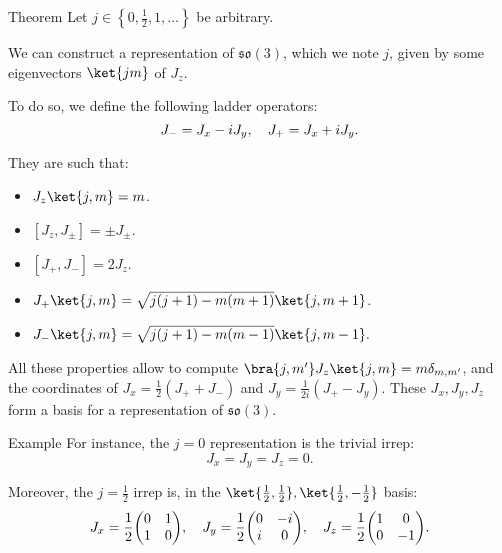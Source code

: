 \documentclass[a4paper]{article}
\begin{document}
\begin{parag}{Theorem}
    Let $j \in \left\{0, \frac{1}{2}, 1, \ldots\right\}$ be arbitrary.

    We can construct a representation of $\mathfrak{so}\left(3\right)$, which we note $j$, given by some eigenvectors $\ket{j m}$ of $J_z$. 

    To do so, we define the following ladder operators: 
    \[J_- = J_x - i J_y, \quad J_+ = J_x + i J_y.\]
    
    They are such that:
    \begin{itemize}
        \item $J_z \ket{j, m} = m$.
        \item $\left[J_z, J_{\pm}\right] = \pm J_{\pm}.$
        \item $\left[J_+, J_-\right] = 2J_z$.
        \item $J_+ \ket{j, m} = \sqrt{j\left(j+1\right) - m\left(m+1\right)} \ket{j, m+1}$.
        \item $J_- \ket{j, m} = \sqrt{j\left(j+1\right) - m\left(m-1\right)} \ket{j, m-1}.$
    \end{itemize}
    
    All these properties allow to compute $\bra{j, m'} J_z \ket{j, m} = m \delta_{m, m'}$, and the coordinates of $J_x = \frac{1}{2}\left(J_+ + J_-\right)$ and $J_y = \frac{1}{2i}\left(J_+ - J_y\right)$. These $J_x, J_y, J_z$ form a basis for a representation of $\mathfrak{so}\left(3\right)$.

    \begin{subparag}{Example}
        For instance, the $j= 0$ representation is the trivial irrep: 
        \[J_x = J_y = J_z = 0.\]

        Moreover, the $j = \frac{1}{2}$ irrep is, in the $\ket{\frac{1}{2}, \frac{1}{2}}, \ket{\frac{1}{2}, -\frac{1}{2}}$ basis: 
        \[J_x = \frac{1}{2} \begin{pmatrix} 0 & 1 \\ 1 & 0 \end{pmatrix}, \mathspace J_y = \frac{1}{2}\begin{pmatrix} 0 & -i \\ i & 0 \end{pmatrix}, \mathspace J_z = \frac{1}{2} \begin{pmatrix} 1 & 0 \\ 0 & -1 \end{pmatrix}.\]


\end{subparag}
\end{parag}
\end{document}

